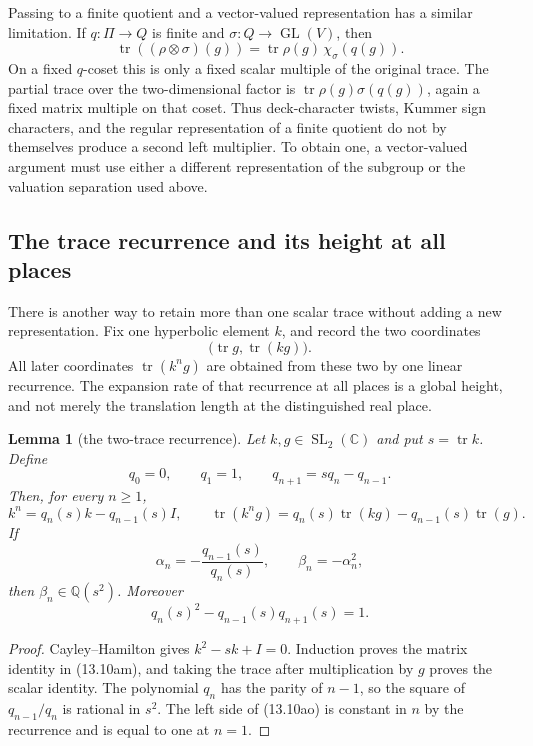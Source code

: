 \documentclass[11pt,reqno]{amsart}
\newtheorem{lemma}[theorem]{Lemma}
\theoremstyle{definition}
\theoremstyle{remark}
\newcommand{\C}{\mathbb C}
\newcommand{\Q}{\mathbb Q}
\newcommand{\Tr}{\operatorname{tr}}
\newcommand{\SL}{\operatorname{SL}}
\newcommand{\GL}{\operatorname{GL}}
\begin{document}
Passing to a finite quotient and a vector-valued representation has a
similar limitation.  If \(q\colon\Pi\to Q\) is finite and
\(\sigma\colon Q\to\GL(V)\), then
\[
 \Tr((\rho\otimes\sigma)(g))
   =\Tr\rho(g)\,\chi_\sigma(q(g)).
\]
On a fixed \(q\)-coset this is only a fixed scalar multiple of the original
trace.  The partial trace over the two-dimensional factor is
\(\Tr\rho(g)\sigma(q(g))\), again a fixed matrix multiple on that coset.
Thus deck-character twists, Kummer sign characters, and the regular
representation of a finite quotient do not by themselves produce a second
left multiplier.  To obtain one, a vector-valued argument must use either a
different representation of the subgroup or the valuation separation used
above.

\subsection{The trace recurrence and its height at all places}

There is another way to retain more than one scalar trace without adding a
new representation.  Fix one hyperbolic element \(k\), and record the two
coordinates
\[
 \bigl(\Tr g,\Tr(kg)\bigr).
\]
All later coordinates \(\Tr(k^ng)\) are obtained from these two by one
linear recurrence.  The expansion rate of that recurrence at all places is
a global height, and not merely the translation length at the distinguished
real place.

\begin{lemma}[the two-trace recurrence]
\label{lem:two-trace-recurrence}
Let \(k,g\in\SL_2(\C)\) and put \(s=\Tr k\).  Define
\[
 q_0=0,\qquad q_1=1,\qquad q_{n+1}=s q_n-q_{n-1}.
\]
Then, for every \(n\ge1\),
\[
 k^n=q_n(s)k-q_{n-1}(s)I,
 \qquad
 \Tr(k^ng)=q_n(s)\Tr(kg)-q_{n-1}(s)\Tr(g).
\tag{13.10am}
\]
If
\[
 \alpha_n=-\frac{q_{n-1}(s)}{q_n(s)},\qquad
 \beta_n=-\alpha_n^2,
\tag{13.10an}
\]
then \(\beta_n\in\Q(s^2)\).  Moreover
\[
 q_n(s)^2-q_{n-1}(s)q_{n+1}(s)=1.
\tag{13.10ao}
\]
\end{lemma}

\begin{proof}
Cayley--Hamilton gives \(k^2-sk+I=0\).  Induction proves the matrix
identity in (13.10am), and taking the trace after multiplication by \(g\)
proves the scalar identity.  The polynomial \(q_n\) has the parity of
\(n-1\), so the square of \(q_{n-1}/q_n\) is rational in \(s^2\).
The left side of (13.10ao) is constant in \(n\) by the recurrence and is
equal to one at \(n=1\).
\end{proof}
\end{document}
